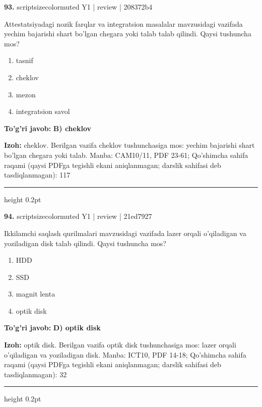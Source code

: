 \documentclass[10pt,a4paper]{article}
\begin{document}
{\bfseries\sffamily\color{ink} 93.} {scriptsizecolor{muted} Y1 | review | 208372b4}
\par
Attestatsiyadagi nozik farqlar va integratsion masalalar mavzusidagi vazifada yechim bajarishi shart bo'lgan chegara yoki talab talab qilindi. Qaysi tushuncha mos?
\begin{enumerate}[label=\Alph*),leftmargin=9mm]
\item tasnif
\item cheklov
\item mezon
\item integratsion savol
\end{enumerate}
\begin{tcolorbox}[enhanced,breakable,colback=teal!4,colframe=teal!60!black,boxrule=0.45pt,arc=1.2mm,left=2.7mm,right=2.7mm,top=1.8mm,bottom=1.8mm,before skip=2mm,after skip=2mm]
{\bfseries\sffamily\color{teal}To'g'ri javob:} \textbf{B) cheklov}
\par\smallskip
{\bfseries Izoh:} cheklov. Berilgan vazifa cheklov tushunchasiga mos: yechim bajarishi shart bo'lgan chegara yoki talab. Manba: CAM10/11, PDF 23-61; Qo'shimcha sahifa raqami (qaysi PDFga tegishli ekani aniqlanmagan; darslik sahifasi deb tasdiqlanmagan): 117
\end{tcolorbox}
\vspace{2mm}\hrule height 0.2pt\vspace{3mm}

{\bfseries\sffamily\color{ink} 94.} {scriptsizecolor{muted} Y1 | review | 21ed7927}
\par
Ikkilamchi saqlash qurilmalari mavzusidagi vazifada lazer orqali o'qiladigan va yoziladigan disk talab qilindi. Qaysi tushuncha mos?
\begin{enumerate}[label=\Alph*),leftmargin=9mm]
\item HDD
\item SSD
\item magnit lenta
\item optik disk
\end{enumerate}
\begin{tcolorbox}[enhanced,breakable,colback=teal!4,colframe=teal!60!black,boxrule=0.45pt,arc=1.2mm,left=2.7mm,right=2.7mm,top=1.8mm,bottom=1.8mm,before skip=2mm,after skip=2mm]
{\bfseries\sffamily\color{teal}To'g'ri javob:} \textbf{D) optik disk}
\par\smallskip
{\bfseries Izoh:} optik disk. Berilgan vazifa optik disk tushunchasiga mos: lazer orqali o'qiladigan va yoziladigan disk. Manba: ICT10, PDF 14-18; Qo'shimcha sahifa raqami (qaysi PDFga tegishli ekani aniqlanmagan; darslik sahifasi deb tasdiqlanmagan): 32
\end{tcolorbox}
\vspace{2mm}\hrule height 0.2pt\vspace{3mm}
\end{document}
